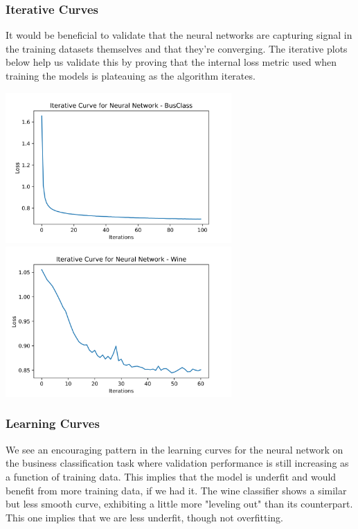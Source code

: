 \documentclass[
	letterpaper, %
]{jdf}
\begin{document}
\subsubsection{Iterative Curves}
It would be beneficial to validate that the neural networks are capturing signal in the training datasets themselves and that they're converging. The iterative plots below help us validate this by proving that the internal loss metric used when training the models is plateauing as the algorithm iterates.

\includegraphics[width=3.4in]{Figures/BusClass-0920/NN/bus_class_iterative_curve.png}
\includegraphics[width=3.4in]{Figures/Wine-0921/NN/wine_iterative_curve.png}

\subsubsection{Learning Curves}
We see an encouraging pattern in the learning curves for the neural network on the business classification task where validation performance is still increasing as a function of training data. This implies that the model is underfit and would benefit from more training data, if we had it. The wine classifier shows a similar but less smooth curve, exhibiting a little more "leveling out" than its counterpart. This one implies that we are less underfit, though not overfitting.
\end{document}
